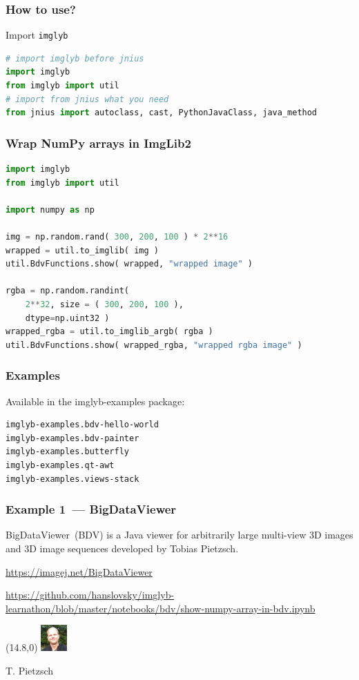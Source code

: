 \documentclass[%
]{beamer}
\newcommand{\urlScrSz}[1]{\scriptsize\url{#1}}
\begin{document}
\begin{frame}[fragile]
    \frametitle{How to use?}
Import \lstinline[language=python,basicstyle=\ttfamily\normalsize]{imglyb}
    \begin{lstlisting}[language=python]
# import imglyb before jnius
import imglyb
from imglyb import util
# import from jnius what you need
from jnius import autoclass, cast, PythonJavaClass, java_method
    \end{lstlisting}
\end{frame}

\begin{frame}[fragile]
    \frametitle{Wrap NumPy arrays in ImgLib2}
    \begin{lstlisting}[language=python]
import imglyb
from imglyb import util

import numpy as np

img = np.random.rand( 300, 200, 100 ) * 2**16
wrapped = util.to_imglib( img )
util.BdvFunctions.show( wrapped, "wrapped image" )

rgba = np.random.randint( 
    2**32, size = ( 300, 200, 100 ), 
    dtype=np.uint32 )
wrapped_rgba = util.to_imglib_argb( rgba )
util.BdvFunctions.show( wrapped_rgba, "wrapped rgba image" )
    \end{lstlisting}

\end{frame}

\begin{frame}[fragile]
    \frametitle{Examples}
    Available in the imglyb-examples package:
    \begin{lstlisting}[language=bash]
imglyb-examples.bdv-hello-world
imglyb-examples.bdv-painter
imglyb-examples.butterfly
imglyb-examples.qt-awt
imglyb-examples.views-stack
    \end{lstlisting}
\end{frame}

\begin{frame}
    \frametitle{Example 1~--- BigDataViewer}
    BigDataViewer~(BDV) is a Java viewer for arbitrarily large multi-view 3D images and 3D image
    sequences developed by Tobias Pietzsch.
    
    \urlScrSz{https://imagej.net/BigDataViewer}
    
    \urlScrSz{https://github.com/hanslovsky/imglyb-learnathon/blob/master/notebooks/bdv/show-numpy-array-in-bdv.ipynb}

    \begin{textblock}{3}(14.8,0)
        \tiny\includegraphics[width=1cm]{fig/people/pietzsch.jpg}

        T. Pietzsch
    \end{textblock}
\end{frame}
\end{document}
